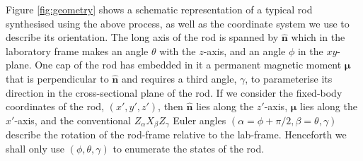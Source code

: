 \documentclass[aps,prl,twocolumn,superscriptaddress]{revtex4-1}
\newcommand{\hvcrm}[1]{\mathbf{\hat{#1}}}
\newcommand{\vc}[1]{\boldsymbol{#1}}
\newcommand{\kk}{\mathrm{k}_B}
\begin{document}
Figure \ref{fig:geometry} shows a schematic representation of a typical rod synthesised using the above process, as well as the coordinate system we use to describe its orientation. The long axis of the rod is spanned by $\hvcrm{n}$ which in the laboratory frame makes an angle $\theta$ with the $z$-axis, and an angle $\phi$ in the $xy$-plane. One cap of the rod has embedded in it a permanent magnetic moment $\vc{\mu}$ that is perpendicular to $\hvcrm{n}$ and requires a third angle, $\gamma$, to parameterise its direction in the cross-sectional plane of the rod. If we consider the fixed-body coordinates of the rod, $(x',y',z')$, then $\hvcrm{n}$ lies along the $z'$-axis, $\vc{\mu}$ lies along the $x'$-axis, and the conventional $Z_\alpha X_\beta Z_\gamma$ Euler angles $(\alpha=\phi+\pi/2, \beta=\theta, \gamma)$ describe the rotation of the rod-frame relative to the lab-frame. Henceforth we shall only use $(\phi,\theta,\gamma)$ to enumerate the states of the rod. 

\end{document}

